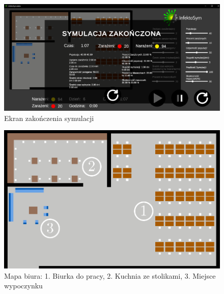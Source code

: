 \begin{figure}[h!]
	\includegraphics[width=\linewidth]{endSim.png}
	\caption{Ekran zakończenia symulacji}
\end{figure}

\begin{figure}[h!]
	\includegraphics[width=\linewidth]{mapWithNumbers.png}
	\caption{Mapa biura: 1. Biurka do pracy, 2. Kuchnia ze stolikami, 3. Miejsce wypoczynku}
\end{figure}


